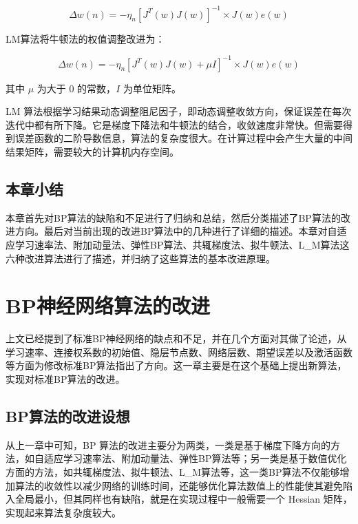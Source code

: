 \documentclass[UTF8]{ctexart}
\begin{document}
\begin{equation}
\Delta w(n) = -\eta_n [J^T(w) J(w)] ^{-1} \times J(w)e(w)
\end{equation}

LM算法将牛顿法的权值调整改进为：

\begin{equation}
\Delta w(n) = -\eta_n [J^T(w) J(w) + \mu I] ^{-1} \times J(w)e(w)
\end{equation}

其中 $\mu$ 为大于 $0$ 的常数，$I$ 为单位矩阵。 \par

LM 算法根据学习结果动态调整阻尼因子，即动态调整收敛方向，保证误差在每次迭代中都有所下降。它是梯度下降法和牛顿法的结合，收敛速度非常快。但需要得到误差函数的二阶导数信息，算法的复杂度很大。在计算过程中会产生大量的中间结果矩阵，需要较大的计算机内存空间。 

\subsection{本章小结}

本章首先对BP算法的缺陷和不足进行了归纳和总结，然后分类描述了BP算法的改进方向。最后对当前出现的改进BP算法中的几种进行了详细的描述。本章对自适应学习速率法、附加动量法、弹性BP算法、共辄梯度法、拟牛顿法、L\_M算法这六种改进算法进行了描述，并归纳了这些算法的基本改进原理。

\section{BP神经网络算法的改进}

上文已经提到了标准BP神经网络的缺点和不足，并在几个方面对其做了论述，从学习速率、连接权系数的初始值、隐层节点数、网络层数、期望误差以及激活函数等方面为修改标准BP算法指出了方向。这一章主要是在这个基础上提出新算法，实现对标准BP算法的改进。

\subsection {BP算法的改进设想}

从上一章中可知，BP 算法的改进主要分为两类，一类是基于梯度下降方向的方法，如自适应学习速率法、附加动量法、弹性BP算法等；另一类是基于数值优化方面的方法，如共辄梯度法、拟牛顿法、L\_M算法等，这一类BP算法不仅能够增加算法的收敛性以减少网络的训练时间，还能够优化算法数值上的性能使其避免陷入全局最小，但其同样也有缺陷，就是在实现过程中一般需要一个 Hessian 矩阵，实现起来算法复杂度较大。 \par
\end{document}
